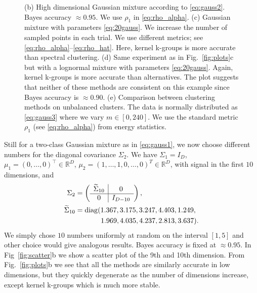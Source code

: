 \documentclass[10pt,journal,compsoc]{IEEEtran}
\DeclareMathOperator{\diag}{diag}
\begin{document}
\begin{figure}
{(b)
High dimensional Gaussian mixture according to \eqref{eq:gauss2}.
Bayes accuracy $\approx 0.95$. We use $\rho_1$ in \eqref{eq:rho_alpha}.
(c)
Gaussian mixture with parameters \eqref{eq:20gauss}. We increase
the number of sampled points in each trial. We use different
metrics; see \eqref{eq:rho_alpha}--\eqref{eq:rho_hat}. 
Here, kernel k-groups is more accurate than spectral clustering.
(d)
Same experiment as in Fig.~\ref{fig:plots}c but with a 
lognormal mixture with parameters \eqref{eq:20gauss}.
Again, kernel k-groups is more accurate than alternatives.
The plot suggests that neither of these methods are
consistent on this example since Bayes accuracy is $\approx 0.90$.
(e)
Comparison between clustering methods
on unbalanced clusters. The data is normally 
distributed as \eqref{eq:gauss3} where
we vary $m \in [0, 240]$. We use the standard metric $\rho_1$ (see
\eqref{eq:rho_alpha}) from energy statistics.
}
\end{figure}

Still for a two-class Gaussian mixture as in \eqref{eq:gauss1}, we now choose
different numbers for the  diagonal covariance $\Sigma_2$.
We have $\Sigma_1=I_D$, $\mu_1=(0,\dotsc,0)^\top \in \mathbb{R}^D$,
$\mu_2=(1,\dotsc,1,0,\dotsc,0)^T \in \mathbb{R}^D$, 
with signal in the first $10$ dimensions, and
\begin{equation}
\label{eq:gauss2}
\begin{split}
\Sigma_2 &= \left( \begin{array}{c|c}
\widetilde{\Sigma}_{10} & 0 \\ \hline 
0 & I_{D-10} \end{array}\right), \\
\widetilde{\Sigma}_{10} &= \diag(1.367,  3.175,  3.247,  4.403,  1.249,\\
&\hspace{3.6em}1.969, 4.035,   4.237,  2.813,  3.637).
\end{split}
\end{equation}
We simply chose $10$ numbers uniformly at random on the interval
$[1,5]$ and other choice would give analogous results.
Bayes  accuracy is fixed at $\approx 0.95$. In Fig~\ref{fig:scatter}b
we show a scatter plot of the 9th and 10th dimension.
From Fig.~\ref{fig:plots}b we see that 
all the methods are similarly accurate in low dimensions, but they quickly
degenerate as the number of dimensions increase, except 
kernel k-groups which is much more stable.
\end{document}

